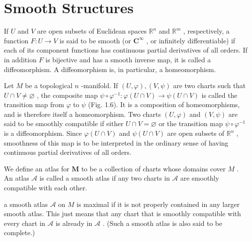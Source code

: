 \section{Smooth Structures}

\begin{definition}
\label{def:1-2-extra-1}
\mathlibok
If $U$ and $V$ are open subsets of Euclidean spaces ${\mathbb{R}}^{n}$ and ${\mathbb{R}}^{m}$ , respectively, a function $F : U \rightarrow  V$ is said to be smooth (or ${\mathbf{C}}^{\infty }$ , or infinitely differentiable) if each of its component functions has continuous partial derivatives of all orders. If in addition $F$ is bijective and has a smooth inverse map, it is called a diffeomorphism. A diffeomorphism is, in particular, a homeomorphism.
\end{definition}

\begin{definition}
\label{def:1-2-extra-2}
\mathlibok
Let $M$ be a topological $n$ -manifold. If $\left( {U,\varphi }\right) ,\left( {V,\psi }\right)$ are two charts such that $U \cap  V \neq  \varnothing$ , the composite map $\psi  \circ  {\varphi }^{-1} : \varphi \left( {U \cap  V}\right)  \rightarrow  \psi \left( {U \cap  V}\right)$ is called the transition map from $\varphi$ to $\psi$ (Fig. 1.6). It is a composition of homeomorphisms, and is therefore itself a homeomorphism. Two charts $\left( {U,\varphi }\right)$ and $\left( {V,\psi }\right)$ are said to be smoothly compatible if either $U \cap  V = \varnothing$ or the transition map $\psi  \circ  {\varphi }^{-1}$ is a diffeomorphism. Since $\varphi \left( {U \cap  V}\right)$ and $\psi \left( {U \cap  V}\right)$ are open subsets of ${\mathbb{R}}^{n}$ , smoothness of this map is to be interpreted in the ordinary sense of having continuous partial derivatives of all orders.
\end{definition}

\begin{definition}
\label{def:1-2-extra-3}
\leanok
We define an atlas for $\mathbf{M}$ to be a collection of charts whose domains cover $M$ . An atlas $\mathcal{A}$ is called a smooth atlas if any two charts in $\mathcal{A}$ are smoothly compatible with each other.
\end{definition}

\begin{definition}
\label{def:1-2-extra-4}
\mathlibok
a smooth atlas $\mathcal{A}$ on $M$ is maximal if it is not properly contained in any larger smooth atlas. This just means that any chart that is smoothly compatible with every chart in $\mathcal{A}$ is already in $\mathcal{A}$ . (Such a smooth atlas is also said to be complete.)
\end{definition}

